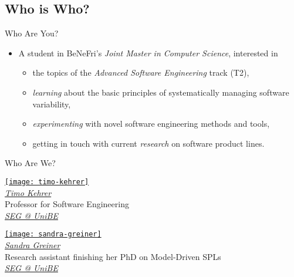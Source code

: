 \subsection{Who is Who?}

\begin{frame}{\myframetitle}
	\begin{mycolumns}
		\begin{example}{Who Are You?}
			\begin{itemize}
				\item A student in BeNeFri's \emph{Joint Master in Computer Science}, interested in
				\begin{itemize}
					\item the topics of the \emph{Advanced Software Engineering} track (T2),
					\item \emph{learning} about the basic principles of systematically managing software variability,
					\item \emph{experimenting} with novel software engineering methods and tools,
					\item getting in touch with current \emph{research} on software product lines.
				\end{itemize}
			\end{itemize}
		\end{example}
	\mynextcolumn
		\begin{note}{Who Are We?}
			\centering
			\parbox{0.45\linewidth}{
				\centering
				\href{https://seg.inf.unibe.ch/people/timo/}{\texttt{[image: timo-kehrer]}}\\[.5ex]
				\href{https://seg.inf.unibe.ch/people/timo/}{\emph{Timo Kehrer}}\\[.5ex]
				\small Professor for Software Engineering \\[.5ex]
				\href{https://seg.inf.unibe.ch/}{\small \emph{SEG @ UniBE}}
			}
			\parbox{0.45\linewidth}{
				\centering
				\href{https://seg.inf.unibe.ch/people/sandra/}{\texttt{[image: sandra-greiner]}}\\[.5ex]
				\href{https://seg.inf.unibe.ch/people/sandra/}{\emph{Sandra Greiner}}\\[.5ex]
				\small Research assistant finishing her PhD on Model-Driven SPLs \\[.5ex]
				\href{https://seg.inf.unibe.ch/}{\small \emph{SEG @ UniBE}}
			}
		\end{note}
	\end{mycolumns}
\end{frame}

